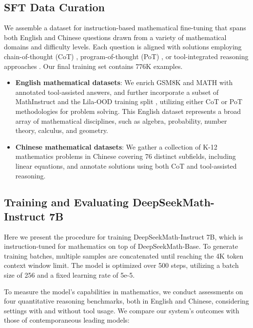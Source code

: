 \subsection{SFT Data Curation}

We assemble a dataset for instruction-based mathematical fine-tuning that spans both English and Chinese questions drawn from a variety of mathematical domains and difficulty levels. Each question is aligned with solutions employing chain-of-thought (CoT) \citep{cot}, program-of-thought (PoT) \citep{pot,pal}, or tool-integrated reasoning approaches \citep{tora}. Our final training set contains 776K examples.

\begin{itemize}[topsep=0pt]
    \item \textbf{English mathematical datasets}: We enrich GSM8K and MATH with annotated tool-assisted answers, and further incorporate a subset of MathInstruct \citep{MathInstruct} and the Lila-OOD training split \citep{lila}, utilizing either CoT or PoT methodologies for problem solving. This English dataset represents a broad array of mathematical disciplines, such as algebra, probability, number theory, calculus, and geometry.
    \item \textbf{Chinese mathematical datasets}: We gather a collection of K-12 mathematics problems in Chinese covering 76 distinct subfields, including linear equations, and annotate solutions using both CoT and tool-assisted reasoning.
\end{itemize}

\subsection{Training and Evaluating DeepSeekMath-Instruct 7B}

Here we present the procedure for training DeepSeekMath-Instruct 7B, which is instruction-tuned for mathematics on top of DeepSeekMath-Base. To generate training batches, multiple samples are concatenated until reaching the 4K token context window limit. The model is optimized over 500 steps, utilizing a batch size of 256 and a fixed learning rate of 5e-5.

To measure the model's capabilities in mathematics, we conduct assessments on four quantitative reasoning benchmarks, both in English and Chinese, considering settings with and without tool usage. We compare our system's outcomes with those of contemporaneous leading models:

